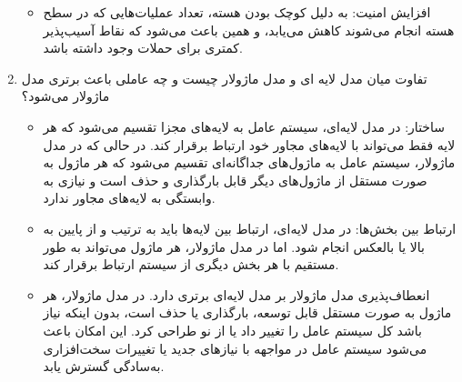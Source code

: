 \begin{enumerate}
\begin{qsolve}
\begin{itemize}
			\item 
			افزایش امنیت: به دلیل کوچک بودن هسته، تعداد عملیات‌هایی که در سطح هسته انجام می‌شوند کاهش می‌یابد، و همین باعث می‌شود که نقاط آسیب‌پذیر کمتری برای حملات وجود داشته باشد.
		\end{itemize}
	\end{qsolve}
	
	
	\item 
	تفاوت میان مدل لایه ای و مدل ماژولار چیست و چه عاملی باعث برتری مدل ماژولار می‌شود؟
	\begin{qsolve}
		\begin{itemize}
			\item 
			ساختار: در مدل لایه‌ای، سیستم عامل به لایه‌های مجزا تقسیم می‌شود که هر لایه فقط می‌تواند با لایه‌های مجاور خود ارتباط برقرار کند. در حالی که در مدل ماژولار، سیستم عامل به ماژول‌های جداگانه‌ای تقسیم می‌شود که هر ماژول به صورت مستقل از ماژول‌های دیگر قابل بارگذاری و حذف است و نیازی به وابستگی به لایه‌های مجاور ندارد.
			
			\item 
			ارتباط بین بخش‌ها: در مدل لایه‌ای، ارتباط بین لایه‌ها باید به ترتیب و از پایین به بالا یا بالعکس انجام شود. اما در مدل ماژولار، هر ماژول می‌تواند به طور مستقیم با هر بخش دیگری از سیستم ارتباط برقرار کند.
		\end{itemize}
		
	\end{qsolve}
	
	
	\begin{qsolve}
		\begin{itemize}
			\item 
			انعطاف‌پذیری مدل ماژولار بر مدل لایه‌ای برتری دارد. در مدل ماژولار، هر ماژول به صورت مستقل قابل توسعه، بارگذاری یا حذف است، بدون اینکه نیاز باشد کل سیستم عامل را تغییر داد یا از نو طراحی کرد. این امکان باعث می‌شود سیستم عامل در مواجهه با نیازهای جدید یا تغییرات سخت‌افزاری به‌سادگی گسترش یابد.
		\end{itemize}
	\end{qsolve}
	
\end{enumerate}